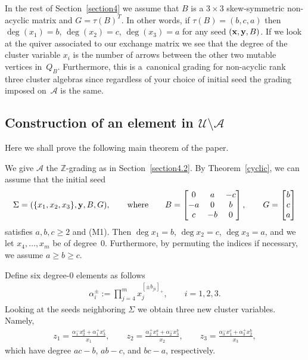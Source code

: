 \documentclass[pdftex]{sigma}
\numberwithin{equation}{section}
\begin{document}
In the rest of Section~\ref{section4} we assume that $B$ is a $3\times 3$ skew-symmetric non-acyclic matrix and $G=\tau(B)^T$. In other words, if $\tau(B)=(b,c,a)$ then $\deg(x_1)=b$, $\deg(x_2)=c$, $\deg(x_3)=a$ for any seed $({\bf x}, {\bf y}, B)$. If we look at the quiver associated to our exchange matrix we see that the degree of the cluster variable $x_i$ is the number of arrows between the other two mutable vertices in~$Q_B$. Furthermore, this is a~canonical grading for non-acyclic rank three cluster algebras since regardless of your choice of initial seed the grading imposed on~$\mathcal{A}$ is the same.

\subsection[Construction of an element in $\mathcal{U}\setminus\mathcal{A}$]{Construction of an element in $\boldsymbol{\mathcal{U}\setminus\mathcal{A}}$}\label{section4.3}
Here we shall prove the following main theorem of the paper.

We give $\mathcal{A}$ the $\mathbb{Z}$-grading as in Section~\ref{section4.2}. By Theorem~\ref{cyclic}, we can assume that the initial seed
\begin{gather*}
\Sigma=(\{x_1,x_2,x_3\},{\bf y},B,G),\qquad\textrm{where} \qquad B= \left[ \begin{matrix}
0 & a &-c \\
-a & 0 & b \\
c& -b & 0
\end{matrix}  \right], \qquad G=\left[ \begin{matrix}
b \\ c \\ a  \end{matrix} \right]
\end{gather*}
satisf\/ies $a,b,c\ge2$ and (M1). Then $\deg x_{1}=b$, $\deg x_{2}=c$, $\deg x_{3}=a$, and we let $x_{4},\dots,x_{m}$ be of degree~0.  Furthermore, by permuting the indices if necessary, we assume
$a\ge b\ge c$.


Def\/ine six degree-0 elements as follows
\begin{gather*}
\alpha_i^\pm := \prod_{j=4}^m x_j^{[\pm b_{ji}]_+}, \qquad i=1,2,3.
\end{gather*}
Looking at the seeds neighboring $\Sigma$ we obtain three new cluster variables. Namely,
\begin{gather*}
z_1=\frac{\alpha_1^-x_2^a+\alpha_1^+x_3^c}{x_1},
\qquad z_2=\frac{\alpha_2^+x_1^a+\alpha_2^-x_3^b}{x_2}, \qquad z_3=\frac{\alpha_3^-x_1^c+\alpha_3^+x_2^b}{x_3},
 \end{gather*} which have degree $ac-b$, $ab-c$, and $bc-a$, respectively.
\end{document}
